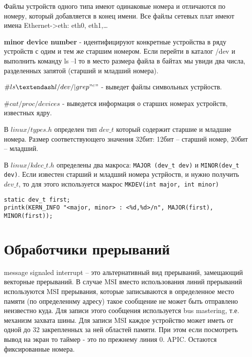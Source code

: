 Файлы устройств одного типа имеют одинаковые номера и отличаются по номеру, который добавляется в конец имени. Все файлы сетевых плат имеют имена Ethernet->eth: eth0, eth1,…

\textbf {minor device number} - идентифицируют конкретные устройства в ряду устройств с одим и тем же старшим номером. Если перейти в каталог /dev и выполнить команду ls –l то в место размера файла в байтах мы увиди два числа, разделенных запятой (старший и младший номера).

$\# ls –l /dev/ | grep "^ c"$ - выведет файлы символьных устрйоств.

$\# cat /proc/devices$ - выведется информация о старших номерах устройств, известных ядру.

В $linux/types.h$ определен тип $dev\_t$ который содержит старшие и младшие номера. Размер соответствующего значения 32бит: 12бит – старший номер, 20бит – младший.

В $linux/kdec\_t.h $ определены два макроса: \verb|MAJOR (dev_t dev)| и \verb|MINOR(dev_t dev)|.
Если известен старший и младший номера устрйоств, и нужно получить $dev\_t$, то для этого используется макрос
\verb|MKDEV(int major, int minor)|

\begin{lstlisting}[caption=Печать старшего и младшего номера устройства]
static dev_t first;
printk(KERN_INFO "<major, minor> : <%d,%d>/n", MAJOR(first), MINOR(first));
\end{lstlisting}

\section{Обработчики прерываний}
message signaled interrupt – это альтернативный вид прерываний, замещающий векторные прерываний.
В случае MSI вместо использования линий прерываний используются MSI прерывания, которые записываются в определенное место памяти (по определеннму адресу) такое сообщение не может быть отправлено неизвестно куда. Для записи этого сообщения используется bus mastering, т.е. механизм захвата шины. Для записи MSI каждое устройство может иметь от одной до 32 закрепленных за ней областей памяти. При этом если посмотреть вывод на экран то таймер - это по прежнему линия 0. APIC. Остаются фиксированные номера. 

